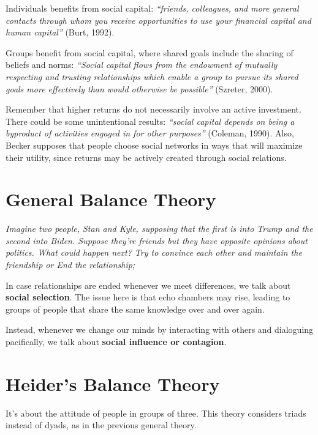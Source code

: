 \documentclass[
  notitlepage,
  onecolumn,
  openany]{book}
\begin{document}
Individuals benefits from social capital: \emph{``friends, colleagues, and
more general contacts through whom you receive opportunities to use your
financial capital and human capital''} (Burt, 1992).

Groups benefit from social capital, where shared goals include the
sharing of beliefs and norms: \emph{``Social capital flows from the endowment
of mutually respecting and trusting relationships which enable a group
to pursue its shared goals more effectively than would otherwise be
possible''} (Szreter, 2000).

Remember that higher returns do not necessarily involve an active
investment. There could be some unintentional results: \emph{``social capital
depends on being a byproduct of activities engaged in for other
purposes''} (Coleman, 1990). Also, Becker supposes that people choose
social networks in ways that will maximize their utility, since returns
may be actively created through social relations.

\hypertarget{general-balance-theory}{%
\section{General Balance Theory}\label{general-balance-theory}}

\emph{Imagine two people, Stan and Kyle, supposing that the first is into
Trump and the second into Biden. Suppose they're friends but they have
opposite opinions about politics. What could happen next? Try to
convince each other and maintain the friendship or End the
relationship;}

In case relationships are ended whenever we meet differences, we talk
about \textbf{social selection}. The issue here is that echo chambers may
rise, leading to groups of people that share the same knowledge over and
over again.

Instead, whenever we change our minds by interacting with others and
dialoguing pacifically, we talk about \textbf{social influence or contagion}.

\hypertarget{heiders-balance-theory}{%
\section{Heider's Balance Theory}\label{heiders-balance-theory}}

It's about the attitude of people in groups of three. This theory
considers triads instead of dyads, as in the previous general theory.
\end{document}
